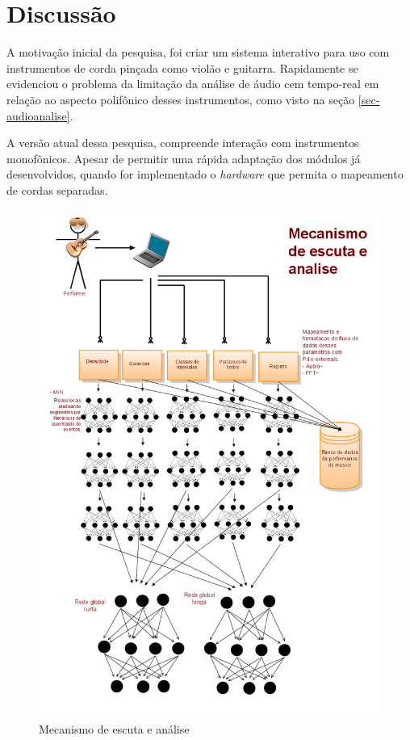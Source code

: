 \documentclass[draft]{ppgmus}
\begin{document}
\section{Discussão}


A motivação inicial da pesquisa, foi criar um sistema interativo
para uso com instrumentos de corda pinçada como violão e guitarra.
Rapidamente se evidenciou o problema da limitação da análise de áudio 
cem tempo-real em relação ao aspecto polifônico desses instrumentos, 
como visto na seção \ref{sec-audioanalise}.

A versão atual dessa pesquisa, compreende interação com instrumentos
monofônicos. Apesar de permitir uma rápida adaptação dos módulos já desenvolvidos, 
quando for implementado o \textit{hardware} que permita o mapeamento de 
cordas separadas.




\begin{figure}
\includegraphics[scale=.5]{escuta}
\caption{Mecanismo de escuta e análise}
\label{escuta}
\end{figure}
\end{document}
